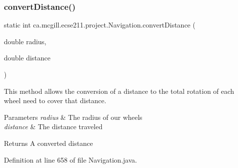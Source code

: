\mbox{\label{classca_1_1mcgill_1_1ecse211_1_1project_1_1_navigation_ac9e260bcd619ffa4820d7d0de7ea1c12}} 
\subsubsection{\texorpdfstring{convert\+Distance()}{convertDistance()}}
{\footnotesize\ttfamily static int ca.\+mcgill.\+ecse211.\+project.\+Navigation.\+convert\+Distance (\begin{DoxyParamCaption}\item[{double}]{radius,  }\item[{double}]{distance }\end{DoxyParamCaption})\hspace{0.3cm}{\ttfamily [static]}}

This method allows the conversion of a distance to the total rotation of each wheel need to cover that distance.


\begin{DoxyParams}{Parameters}
{\em radius} & The radius of our wheels \\
\hline
{\em distance} & The distance traveled \\
\hline
\end{DoxyParams}
\begin{DoxyReturn}{Returns}
A converted distance 
\end{DoxyReturn}


Definition at line 658 of file Navigation.\+java.


